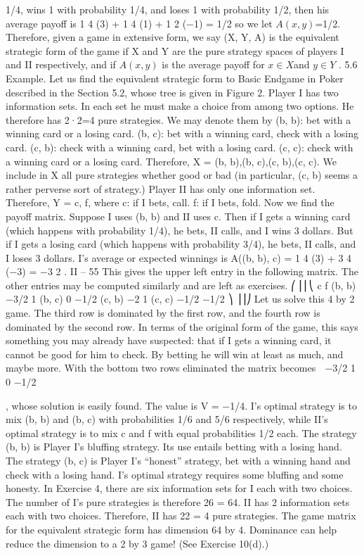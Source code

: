 1/4, wins 1 with probability 1/4, and loses 1 with probability 1/2, then his average payoff
is 1
4 (3) + 1
4 (1) + 1
2 (−1) = 1/2 so we let $A(x, y)$=1/2.
Therefore, given a game in extensive form, we say (X, Y, A) is the equivalent strategic
form of the game if X and Y are the pure strategy spaces of players I and II respectively,
and if $A(x, y)$ is the average payoff for $x \in X $and $y \in Y $ .
5.6 Example. Let us find the equivalent strategic form to Basic Endgame in Poker
described in the Section 5.2, whose tree is given in Figure 2. Player I has two information
sets. In each set he must make a choice from among two options. He therefore has 2·2=4
pure strategies. We may denote them by
(b, b): bet with a winning card or a losing card.
(b, c): bet with a winning card, check with a losing card.
(c, b): check with a winning card, bet with a losing card.
(c, c): check with a winning card or a losing card.
Therefore, X = {(b, b),(b, c),(c, b),(c, c)}. We include in X all pure strategies whether
good or bad (in particular, (c, b) seems a rather perverse sort of strategy.)
Player II has only one information set. Therefore, Y = {c, f}, where
c: if I bets, call.
f: if I bets, fold.
Now we find the payoff matrix. Suppose I uses (b, b) and II uses c. Then if I gets a
winning card (which happens with probability 1/4), he bets, II calls, and I wins 3 dollars.
But if I gets a losing card (which happens with probability 3/4), he bets, II calls, and I
loses 3 dollars. I’s average or expected winnings is
A((b, b), c) = 1
4
(3) + 3
4
(−3) = −3
2
.
II – 55
This gives the upper left entry in the following matrix. The other entries may be computed
similarly and are left as exercises.
⎛
⎜⎜⎝
c f
(b, b) −3/2 1
(b, c) 0 −1/2
(c, b) −2 1
(c, c) −1/2 −1/2
⎞
⎟⎟⎠
Let us solve this 4 by 2 game. The third row is dominated by the first row, and the
fourth row is dominated by the second row. In terms of the original form of the game, this
says something you may already have suspected: that if I gets a winning card, it cannot
be good for him to check. By betting he will win at least as much, and maybe more. With
the bottom two rows eliminated the matrix becomes  −3/2 1
0 −1/2

, whose solution is
easily found. The value is V = −1/4. I’s optimal strategy is to mix (b, b) and (b, c) with
probabilities 1/6 and 5/6 respectively, while II’s optimal strategy is to mix c and f with
equal probabilities 1/2 each. The strategy (b, b) is Player I’s bluffing strategy. Its use
entails betting with a losing hand. The strategy (b, c) is Player I’s “honest” strategy, bet
with a winning hand and check with a losing hand. I’s optimal strategy requires some
bluffing and some honesty.
In Exercise 4, there are six information sets for I each with two choices. The number
of I’s pure strategies is therefore 26 = 64. II has 2 information sets each with two choices.
Therefore, II has 22 = 4 pure strategies. The game matrix for the equivalent strategic
form has dimension 64 by 4. Dominance can help reduce the dimension to a 2 by 3 game!
(See Exercise 10(d).)
